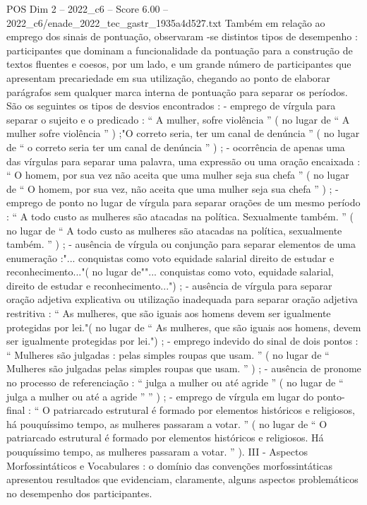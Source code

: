 \begin{textsample}{POS Dim 2 – 2022\_c6 – Score 6.00 – 2022\_c6/enade\_2022\_tec\_gastr\_1935a4d527.txt}
Também em relação ao emprego dos sinais de pontuação, observaram -se distintos tipos de desempenho : participantes que dominam a funcionalidade da pontuação para a construção de textos fluentes e coesos, por um lado, e um grande número de participantes que apresentam precariedade em sua utilização, chegando ao ponto de elaborar parágrafos sem qualquer marca interna de pontuação para separar os períodos.
São os seguintes os tipos de desvios encontrados : - emprego de vírgula para separar o sujeito e o predicado : “ A mulher, sofre violência ” ( no lugar de “ A mulher sofre violência ” ) ;"O correto seria, ter um canal de denúncia ” ( no lugar de “ o correto seria ter um canal de denúncia ” ) ; - ocorrência de apenas uma das vírgulas para separar uma palavra, uma expressão ou uma oração encaixada : “ O homem, por sua vez não aceita que uma mulher seja sua chefa ” ( no lugar de “ O homem, por sua vez, não aceita que uma mulher seja sua chefa ” ) ; - emprego de ponto no lugar de vírgula para separar orações de um mesmo período : “ A todo custo as mulheres são atacadas na política.
Sexualmente também. ” ( no lugar de “ A todo custo as mulheres são atacadas na política, sexualmente também. ” ) ; - ausência de vírgula ou conjunção para separar elementos de uma enumeração :"... conquistas como voto equidade salarial direito de estudar e reconhecimento..."( no lugar de""... conquistas como voto, equidade salarial, direito de estudar e reconhecimento...") ; - ausência de vírgula para separar oração adjetiva explicativa ou utilização inadequada para separar oração adjetiva restritiva : “ As mulheres, que são iguais aos homens devem ser igualmente protegidas por lei."( no lugar de “ As mulheres, que são iguais aos homens, devem ser igualmente protegidas por lei.") ; - emprego indevido do sinal de dois pontos : “ Mulheres são julgadas : pelas simples roupas que usam. ” ( no lugar de “ Mulheres são julgadas pelas simples roupas que usam. ” ) ; - ausência de pronome no processo de referenciação : “ julga a mulher ou até agride ” ( no lugar de “ julga a mulher ou até a agride ” ” ) ; - emprego de vírgula em lugar do ponto-final : “ O patriarcado estrutural é formado por elementos históricos e religiosos, há pouquíssimo tempo, as mulheres passaram a votar. ” ( no lugar de “ O patriarcado estrutural é formado por elementos históricos e religiosos.
Há pouquíssimo tempo, as mulheres passaram a votar. ” ).
III - Aspectos Morfossintáticos e Vocabulares : o domínio das convenções morfossintáticas apresentou resultados que evidenciam, claramente, alguns aspectos problemáticos no desempenho dos participantes.

\end{textsample}
